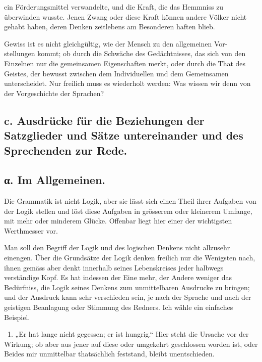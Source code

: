 ein Förderungsmittel verwandelte, und die Kraft, die das Hemmniss zu überwinden wusste. Jenen Zwang oder diese Kraft können andere Völker nicht gehabt haben, deren Denken zeitlebens am Besonderen haften blieb.

Gewiss ist es nicht gleichgültig, wie der Mensch zu den allgemeinen Vor-\label{sp.448} stellungen kommt; ob durch die Schwäche des Gedächtnisses, das sich von den Einzelnen nur die gemeinsamen Eigenschaften merkt, oder durch die That des Geistes, der bewusst zwischen dem Individuellen und dem Gemeinsamen unterscheidet. Nur freilich muss es wiederholt werden: Was wissen wir denn von der Vorgeschichte der Sprachen?

\subsection*{c. Ausdrücke für die Beziehungen der Satzglieder und Sätze untereinander und des Sprechenden zur Rede.}\label{IV.IV.Ic}

\subsection*{α. Im Allgemeinen.}\label{IV.IV.Icalpha}

Die Grammatik ist nicht Logik, aber sie lässt sich einen Theil ihrer Aufgaben von der Logik stellen und löst diese Aufgaben in grösserem oder kleinerem Umfange, mit mehr oder minderem Glücke. Offenbar liegt hier einer der wichtigsten Werthmesser vor.

Man soll den Begriff der Logik und des logischen Denkens nicht allzusehr einengen. Über die Grundsätze der Logik denken freilich nur die Wenigsten nach, ihnen gemäss aber denkt innerhalb seines Lebenskreises jeder halbwegs verständige Kopf. Es hat indessen der Eine mehr, der Andere weniger das Bedürfniss, die Logik seines Denkens zum unmittelbaren Ausdrucke zu bringen; und der Ausdruck kann sehr verschieden sein, je nach der Sprache und nach der geistigen Beanlagung oder Stimmung des Redners. Ich wähle ein einfaches Beispiel.

~1. „Er hat lange nicht gegessen; er ist hungrig.“ Hier steht die Ursache vor der Wirkung; ob aber aus jener auf diese oder umgekehrt geschlossen worden ist, oder Beides mir unmittelbar thatsächlich feststand, bleibt unentschieden.

